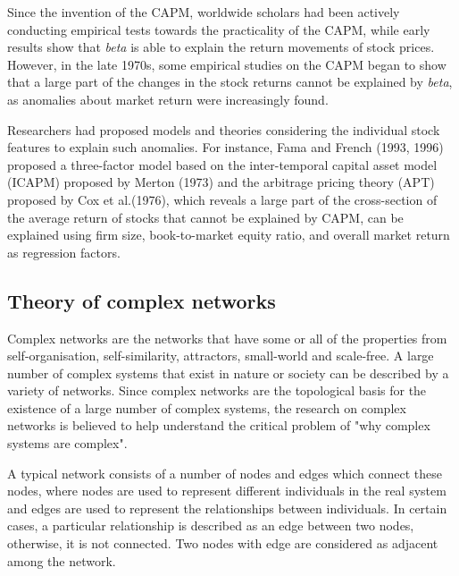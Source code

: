 Since the invention of the CAPM, worldwide scholars had been actively conducting empirical tests towards the practicality of the CAPM, while early results show that \textit{beta} is able to explain the return movements of stock prices. However, in the late 1970s, some empirical studies on the CAPM began to show that a large part of the changes in the stock returns cannot be explained by \textit{beta}, as anomalies about market return were increasingly found.

Researchers had proposed models and theories considering the individual stock features to explain such anomalies. For instance, Fama and French (1993, 1996) proposed a three-factor model based on the inter-temporal capital asset model (ICAPM) \cite{intertemporal} proposed by Merton (1973) and the arbitrage pricing theory (APT)~\cite{options} proposed by Cox et al.(1976), which reveals a large part of the cross-section of the average return of stocks that cannot be explained by CAPM, can be explained using firm size, book-to-market equity ratio, and overall market return~\cite{riskfactors, anomalies} as regression factors.


\subsection{Theory of complex networks}
Complex networks are the networks that have some or all of the properties from self-organisation, self-similarity, attractors, small-world and scale-free. A large number of complex systems that exist in nature or society can be described by a variety of networks. Since complex networks are the topological basis for the existence of a large number of complex systems, the research on complex networks is believed to help understand the critical problem of "why complex systems are complex".

A typical network consists of a number of nodes and edges which connect these nodes, where nodes are used to represent different individuals in the real system and edges are used to represent the relationships between individuals. In certain cases, a particular relationship is described as an edge between two nodes, otherwise, it is not connected. Two nodes with edge are considered as adjacent among the network.

